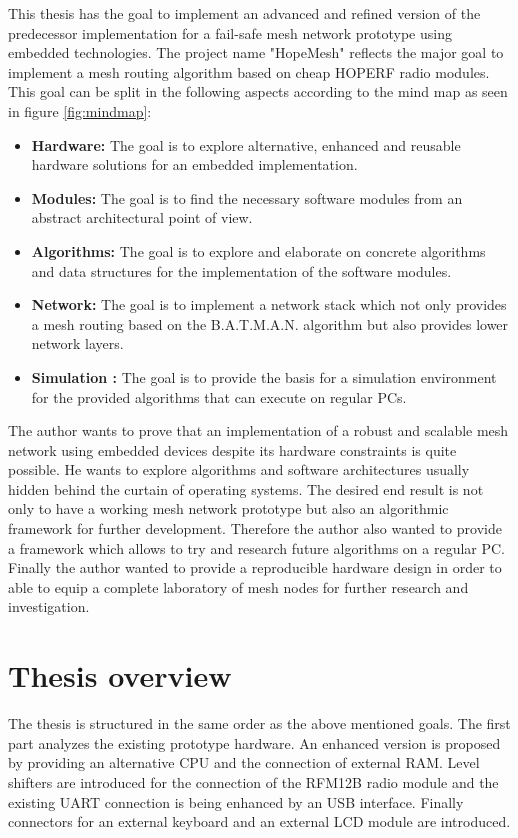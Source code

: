 This thesis has the goal to implement an advanced and refined version of the predecessor implementation \cite{korniowski} for a fail-safe mesh network prototype using embedded technologies. The project name "HopeMesh" reflects the major goal to implement a mesh routing algorithm based on cheap HOPERF radio modules. This goal can be split in the following aspects according to the mind map as seen in figure \ref{fig:mindmap}:
\begin{itemize}
\item \textbf{Hardware: } The goal is to explore alternative, enhanced and reusable hardware solutions for an embedded implementation.
\item \textbf{Modules:} The goal is to find the necessary software modules from an abstract architectural point of view.
\item \textbf{Algorithms:} The goal is to explore and elaborate on concrete algorithms and data structures for the implementation of the software modules.
\item \textbf{Network:} The goal is to implement a network stack which not only provides a mesh routing based on the B.A.T.M.A.N. algorithm but also provides lower network layers.
\item \textbf{Simulation :} The goal is to provide the basis for a simulation environment for the provided algorithms that can execute on regular PCs.
\end{itemize}

The author wants to prove that an implementation of a robust and scalable mesh network using embedded devices despite its hardware constraints is quite possible. He wants to explore algorithms and software architectures usually hidden behind the curtain of operating systems.
The desired end result is not only to have a working mesh network prototype but also an algorithmic framework for further development. Therefore the author also wanted to provide a framework which allows to try and research future algorithms on a regular PC.
Finally the author wanted to provide a reproducible hardware design in order to able to equip a complete laboratory of mesh nodes for further research and investigation.

\section{Thesis overview}
The thesis is structured in the same order as the above mentioned goals. The first part analyzes the existing prototype hardware. An enhanced version is proposed by providing an alternative CPU and the connection of external RAM. Level shifters are introduced for the connection of the RFM12B radio module and the existing UART connection is being enhanced by an USB interface. Finally connectors for an external keyboard and an external LCD module are introduced.


